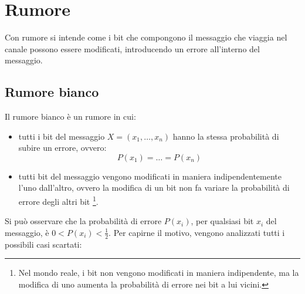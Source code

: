 \chapter{Rumore}
Con rumore si intende come i bit che compongono il messaggio che viaggia nel canale
possono essere modificati, introducendo un errore all'interno del messaggio.

\section{Rumore bianco}
Il rumore bianco è un rumore in cui:
\begin{itemize}
    \item tutti i bit del messaggio $X = (x_1, \ldots, x_n)$ hanno la stessa
    probabilità di subire un errore, ovvero:
    \[
        P(x_1) = \ldots = P(x_n)
    \]
    \item tutti bit del messaggio
    vengono modificati in maniera indipendentemente l'uno dall'altro, ovvero la
    modifica di un bit non fa variare la probabilità di errore degli altri bit
    \footnote{Nel mondo reale, i bit non vengono modificati in maniera indipendente,
    ma la modifica di uno aumenta la probabilità di errore nei bit a lui vicini.}.
\end{itemize}
Si può osservare che la probabilità di errore $P(x_i)$, per qualsiasi bit $x_i$
del messaggio, è $0 < P(x_i) < \frac{1}{2}$. Per capirne il motivo, vengono
analizzati tutti i possibili casi scartati:

